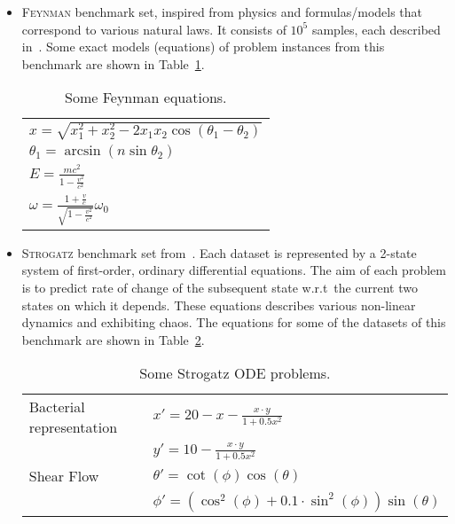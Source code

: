 \documentclass[a4paper,12pt]{elsarticle}
\begin{document}
\begin{itemize}
	\item \textsc{Feynman} benchmark set, inspired from physics and formulas/models that correspond to various natural laws.  
	It consists of $10^5$  samples, each described in~\cite{udrescu2020ai}. Some exact models (equations) of problem instances from this benchmark are shown in Table~\ref{tab:Feynamn-Eq}.  
	
   \begin{table}
		\centering
		\begin{tabular}{l}   \hline
	       $x = \sqrt{x_1^2 + x_2^2 - 2 x_1 x_2 \cos(\theta_1 - \theta_2)}$ \\
	       $ \theta_1 = \arcsin(n \sin \theta_2)$ \\
	       $E =  \frac{m c^2 }{1 - \frac{v^2}{c^2}}$ \\
	       $\omega = \frac{1 + \frac{v}{c}}{ \sqrt{1 - \frac{v^2}{c^2}}} \omega_0$ \\ \hline
	       
	    \end{tabular}
		\caption{Some Feynman equations.}
		\label{tab:Feynamn-Eq}
	\end{table}


	\item \textsc{Strogatz} benchmark set from~\cite{la2016inference}. 
	Each dataset is represented by a 2-state system of first-order, ordinary differential equations. 
	The aim of each problem is to predict rate of change of the subsequent state w.r.t\  the current two states on which it depends. These equations describes various non-linear dynamics and exhibiting chaos.  The equations for some of the datasets of this benchmark are shown in Table~\ref{table:strogatz-ODEs}.
	
	
	\begin{table}
		\centering
		\begin{tabular}{ll} \\ \hline
			Bacterial representation &   $x' = 20 - x - \frac{x \cdot y}{1 + 0.5 x^2 }$ \\ 
			                         &   $y' = 10 - \frac{x \cdot y}{1 + 0.5 x^2  }$ \\ \hline
			Shear Flow               &  $\theta' = \cot(\phi)\cos(\theta)$ \\
			                         &  $ \phi'  = ( \cos^2(\phi) + 0.1 \cdot \sin^2 (\phi)) \sin(\theta) $ \\ \hline
		\end{tabular}
	    \caption{Some Strogatz ODE problems.}
	    \label{table:strogatz-ODEs}
	\end{table}
	 

\end{itemize}
\end{document}
